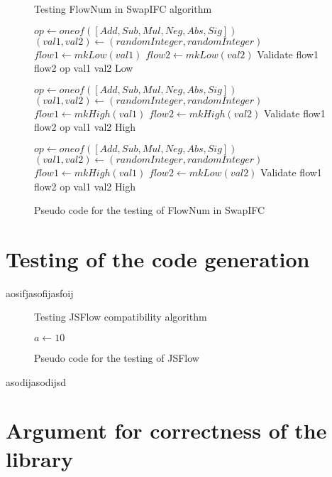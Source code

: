 \begin{figure}[h]
  \begin{algorithm}[H]
    \caption{Testing FlowNum in SwapIFC algorithm}
    \begin{algorithmic}
      \State $op\gets oneof([Add, Sub, Mul, Neg, Abs, Sig])$
      \State $(val1, val2)\gets (randomInteger, randomInteger)$
      \State $flow1\gets mkLow(val1)$
      \State $flow2\gets mkLow(val2)$
      \State
      \Return Validate flow1 flow2 op val1 val2 Low
      \EndFunction

      \State $op\gets oneof([Add, Sub, Mul, Neg, Abs, Sig])$
      \State $(val1, val2)\gets (randomInteger, randomInteger)$
      \State $flow1\gets mkHigh(val1)$
      \State $flow2\gets mkHigh(val2)$
      \State
      \Return Validate flow1 flow2 op val1 val2 High
      \EndFunction

      \State $op\gets oneof([Add, Sub, Mul, Neg, Abs, Sig])$
      \State $(val1, val2)\gets (randomInteger, randomInteger)$
      \State $flow1\gets mkHigh(val1)$
      \State $flow2\gets mkLow(val2)$
      \State
      \Return Validate flow1 flow2 op val1 val2 High
      \EndFunction
    \end{algorithmic}
  \end{algorithm}
  \caption{Pseudo code for the testing of FlowNum in SwapIFC}
  \label{fig:testing_swapifc}
\end{figure}

\section{Testing of the code generation}
aosifjasofijasfoij
\begin{figure}[h]
  \begin{algorithm}[H]
    \caption{Testing JSFlow compatibility algorithm}
    \begin{algorithmic}
      \State $a\gets 10$
      \EndIf
    \end{algorithmic}
  \end{algorithm}
  \caption{Pseudo code for the testing of JSFlow}
  \label{fig:testing_jsflow}
\end{figure}
asodijasodijsd

\section{Argument for correctness of the library}

